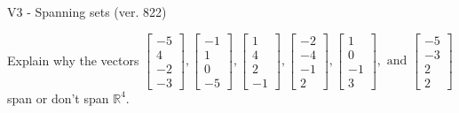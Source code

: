 \begin{exercise}
  \begin{exerciseTitle}V3 - Spanning sets (ver. 822)\end{exerciseTitle}
  \begin{exerciseStatement}
    Explain why the vectors \(\left[\begin{array}{r}
-5 \\
4 \\
-2 \\
-3
\end{array}\right] , \left[\begin{array}{r}
-1 \\
1 \\
0 \\
-5
\end{array}\right] , \left[\begin{array}{r}
1 \\
4 \\
2 \\
-1
\end{array}\right] , \left[\begin{array}{r}
-2 \\
-4 \\
-1 \\
2
\end{array}\right] , \left[\begin{array}{r}
1 \\
0 \\
-1 \\
3
\end{array}\right] , \text{ and } \left[\begin{array}{r}
-5 \\
-3 \\
2 \\
2
\end{array}\right]\) span or don't span \(\mathbb{R}^4\). 
	



\end{exerciseStatement}
\end{exercise}
